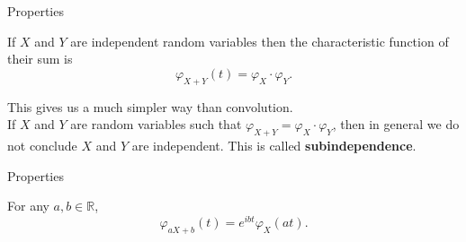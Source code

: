 \documentclass{beamer}
\newcommand{\reals}{\mathbb{R}}
\begin{document}
\begin{frame}{Properties}
\begin{theorem}
	If $X$ and $Y$ are independent random variables then the characteristic function of their sum is
	$$\varphi_{X+Y}(t) = \varphi_{X}\cdot\varphi_{Y}.$$
\end{theorem}
	This gives us a much simpler way than convolution.\\\pause
	If $X$ and $Y$ are random variables such that $\varphi_{X+Y} = \varphi_X\cdot\varphi_Y $, then in general we do not conclude $X$ and $Y$ are independent. This is called \textbf{subindependence}.
\end{frame}
\begin{frame}{Properties}
\begin{theorem}
	For any $a,b \in \reals$, $$\varphi_{aX+b}(t)=e^{ibt}\varphi_X(at).$$
\end{theorem}
\end{frame}
\end{document}
